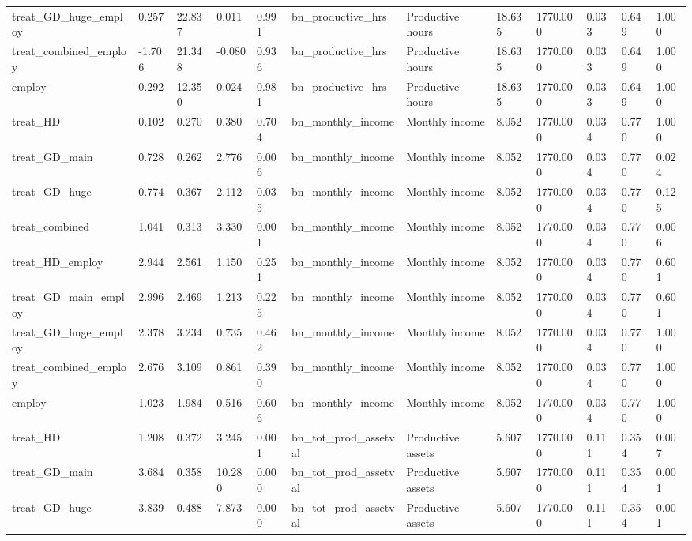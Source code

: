 \begin{tabular}{llllllllllll}
treat\_GD\_huge\_employ & 0.257 & 22.837 & 0.011 & 0.991 & bn\_productive\_hrs & Productive hours & 18.635 & 1770.000 & 0.033 & 0.649 & 1.000 \\
treat\_combined\_employ & -1.706 & 21.348 & -0.080 & 0.936 & bn\_productive\_hrs & Productive hours & 18.635 & 1770.000 & 0.033 & 0.649 & 1.000 \\
employ & 0.292 & 12.350 & 0.024 & 0.981 & bn\_productive\_hrs & Productive hours & 18.635 & 1770.000 & 0.033 & 0.649 & 1.000 \\
treat\_HD & 0.102 & 0.270 & 0.380 & 0.704 & bn\_monthly\_income & Monthly income & 8.052 & 1770.000 & 0.034 & 0.770 & 1.000 \\
treat\_GD\_main & 0.728 & 0.262 & 2.776 & 0.006 & bn\_monthly\_income & Monthly income & 8.052 & 1770.000 & 0.034 & 0.770 & 0.024 \\
treat\_GD\_huge & 0.774 & 0.367 & 2.112 & 0.035 & bn\_monthly\_income & Monthly income & 8.052 & 1770.000 & 0.034 & 0.770 & 0.125 \\
treat\_combined & 1.041 & 0.313 & 3.330 & 0.001 & bn\_monthly\_income & Monthly income & 8.052 & 1770.000 & 0.034 & 0.770 & 0.006 \\
treat\_HD\_employ & 2.944 & 2.561 & 1.150 & 0.251 & bn\_monthly\_income & Monthly income & 8.052 & 1770.000 & 0.034 & 0.770 & 0.601 \\
treat\_GD\_main\_employ & 2.996 & 2.469 & 1.213 & 0.225 & bn\_monthly\_income & Monthly income & 8.052 & 1770.000 & 0.034 & 0.770 & 0.601 \\
treat\_GD\_huge\_employ & 2.378 & 3.234 & 0.735 & 0.462 & bn\_monthly\_income & Monthly income & 8.052 & 1770.000 & 0.034 & 0.770 & 1.000 \\
treat\_combined\_employ & 2.676 & 3.109 & 0.861 & 0.390 & bn\_monthly\_income & Monthly income & 8.052 & 1770.000 & 0.034 & 0.770 & 1.000 \\
employ & 1.023 & 1.984 & 0.516 & 0.606 & bn\_monthly\_income & Monthly income & 8.052 & 1770.000 & 0.034 & 0.770 & 1.000 \\
treat\_HD & 1.208 & 0.372 & 3.245 & 0.001 & bn\_tot\_prod\_assetval & Productive assets & 5.607 & 1770.000 & 0.111 & 0.354 & 0.007 \\
treat\_GD\_main & 3.684 & 0.358 & 10.280 & 0.000 & bn\_tot\_prod\_assetval & Productive assets & 5.607 & 1770.000 & 0.111 & 0.354 & 0.001 \\
treat\_GD\_huge & 3.839 & 0.488 & 7.873 & 0.000 & bn\_tot\_prod\_assetval & Productive assets & 5.607 & 1770.000 & 0.111 & 0.354 & 0.001 \\

\end{tabular}
